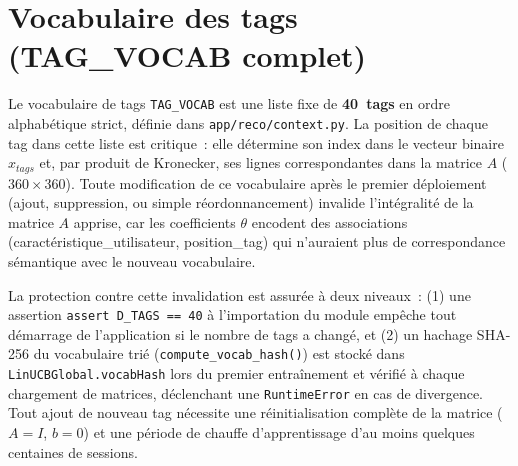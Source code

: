 
\section{Vocabulaire des tags (TAG\_VOCAB complet)}
\label{ann:tagvocab}

Le vocabulaire de tags \texttt{TAG\_VOCAB} est une liste fixe de \textbf{40~tags} en ordre
alphabétique strict, définie dans \texttt{app/reco/context.py}. La position de chaque tag
dans cette liste est critique~: elle détermine son index dans le vecteur binaire $x_{tags}$
et, par produit de Kronecker, ses lignes correspondantes dans la matrice $A$ ($360 \times 360$).
Toute modification de ce vocabulaire après le premier déploiement (ajout, suppression, ou
simple réordonnancement) invalide l'intégralité de la matrice $A$ apprise, car les
coefficients $\theta$ encodent des associations (caractéristique\_utilisateur, position\_tag)
qui n'auraient plus de correspondance sémantique avec le nouveau vocabulaire.

La protection contre cette invalidation est assurée à deux niveaux~: (1) une assertion
\texttt{assert D\_TAGS == 40} à l'importation du module empêche tout démarrage de
l'application si le nombre de tags a changé, et (2) un hachage SHA-256 du vocabulaire
trié (\texttt{compute\_vocab\_hash()}) est stocké dans \texttt{LinUCBGlobal.vocabHash} lors
du premier entraînement et vérifié à chaque chargement de matrices, déclenchant une
\texttt{RuntimeError} en cas de divergence. Tout ajout de nouveau tag nécessite une
réinitialisation complète de la matrice ($A = I$, $b = 0$) et une période de chauffe
d'apprentissage d'au moins quelques centaines de sessions.

